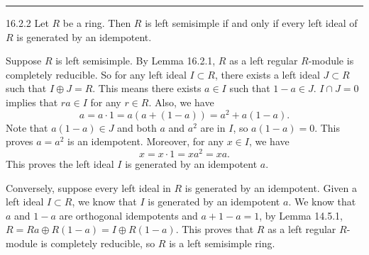 \documentclass[a4paper, 12pt]{article}
\begin{document}
\noindent\rule{7in}{2.8pt}
\newpage
\begin{problem}{16.2.2}
Let \(R\) be a ring. Then \(R\) is left semisimple if and only if every left ideal of \(R\) is generated by an idempotent.
\end{problem}
\begin{solution}
Suppose \(R\) is left semisimple. By Lemma 16.2.1, \(R\) as a left regular \(R\)-module is completely reducible. So for any left ideal \(I\subset R\), there exists a left ideal \(J\subset R\) such that 
\(I\oplus J=R\). This means there exists \(a\in I\) such that \(1-a\in J\). \(I\cap J=0\) implies that \(ra\in I\) for any \(r\in R\). Also, we have 
\[a=a\cdot 1=a(a+(1-a))=a^2+a(1-a).\]
Note that \(a(1-a)\in J\) and both \(a\) and \(a^2\) are in \(I\), so \(a(1-a)=0\). This proves \(a=a^2\) is an idempotent. Moreover, for any \(x\in I\), we have 
\[x=x\cdot 1=xa^2=xa.\]
This proves the left ideal \(I\) is generated by an idempotent \(a\). 

Conversely, suppose every left ideal in \(R\) is generated by an idempotent. Given a left ideal \(I\subset R\), we know that \(I\) is generated by an idempotent \(a\). We know that 
\(a\) and \(1-a\) are orthogonal idempotents and \(a+1-a=1\), by Lemma 14.5.1, \(R=Ra\oplus R(1-a)=I\oplus R(1-a)\). This proves that \(R\) as a left regular \(R\)-module is completely reducible, so \(R\) is a left semisimple ring.  
\end{solution}
\end{document}
